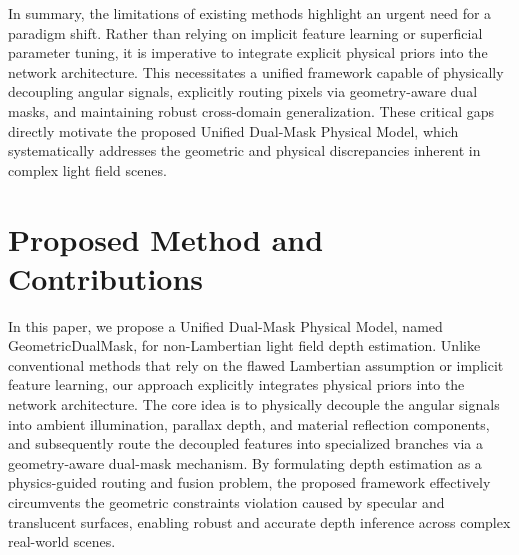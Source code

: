 \begin{table}[!t]
\centering
\caption{Summary of Limitations in Existing Light Field Depth Estimation Methods}
\label{tab:limitations_summary}
\end{table}

In summary, the limitations of existing methods highlight an urgent need for a paradigm shift. Rather than relying on implicit feature learning or superficial parameter tuning, it is imperative to integrate explicit physical priors into the network architecture. This necessitates a unified framework capable of physically decoupling angular signals, explicitly routing pixels via geometry-aware dual masks, and maintaining robust cross-domain generalization. These critical gaps directly motivate the proposed Unified Dual-Mask Physical Model, which systematically addresses the geometric and physical discrepancies inherent in complex light field scenes.

\section{Proposed Method and Contributions}

In this paper, we propose a Unified Dual-Mask Physical Model, named GeometricDualMask, for non-Lambertian light field depth estimation. Unlike conventional methods that rely on the flawed Lambertian assumption or implicit feature learning, our approach explicitly integrates physical priors into the network architecture. The core idea is to physically decouple the angular signals into ambient illumination, parallax depth, and material reflection components, and subsequently route the decoupled features into specialized branches via a geometry-aware dual-mask mechanism. By formulating depth estimation as a physics-guided routing and fusion problem, the proposed framework effectively circumvents the geometric constraints violation caused by specular and translucent surfaces, enabling robust and accurate depth inference across complex real-world scenes.

